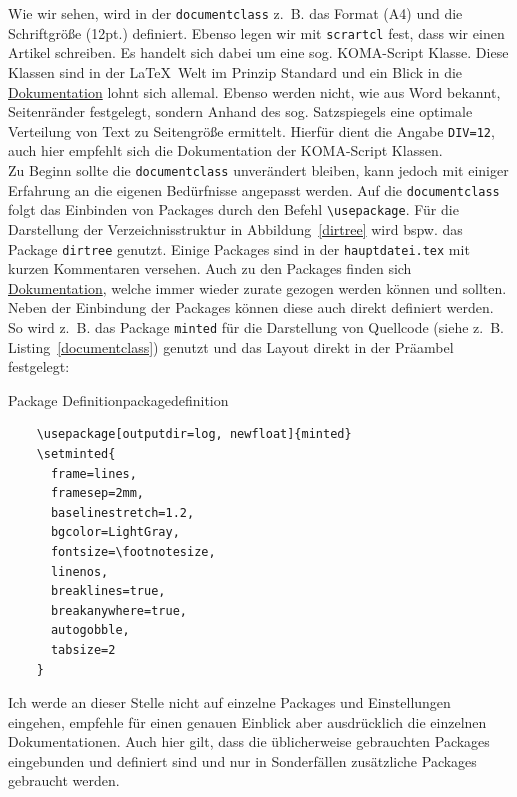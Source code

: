Wie wir sehen, wird in der \texttt{documentclass} z. B. das Format (A4) und die
Schriftgröße (12pt.) definiert. Ebenso legen wir mit \texttt{scrartcl} fest,
dass wir einen Artikel schreiben. Es handelt sich dabei um eine sog. KOMA-Script
Klasse. Diese Klassen sind in der \LaTeX~Welt im Prinzip Standard und ein Blick
in die
\href{https://ftp.agdsn.de/pub/mirrors/latex/dante/macros/latex/contrib/koma-script/doc/scrguide-de.pdf}{Dokumentation}
lohnt sich allemal. Ebenso werden nicht, wie aus Word bekannt, Seitenränder
festgelegt, sondern Anhand des sog. Satzspiegels eine optimale Verteilung von
Text zu Seitengröße ermittelt. Hierfür dient die Angabe \texttt{DIV=12}, auch
hier empfehlt sich die Dokumentation der KOMA-Script Klassen.\\ Zu Beginn sollte
die \texttt{documentclass} unverändert bleiben, kann jedoch mit einiger Erfahrung an die 
eigenen Bedürfnisse angepasst werden. Auf die
\texttt{documentclass} folgt das Einbinden von Packages durch den Befehl
\texttt{\textbackslash usepackage}. Für die Darstellung der Verzeichnisstruktur
in Abbildung~\ref{dirtree} wird bspw. das Package \texttt{dirtree} genutzt.
Einige Packages sind in der \texttt{hauptdatei.tex} mit kurzen Kommentaren
versehen. Auch zu den Packages finden sich
\href{https://www.ctan.org}{Dokumentation}, welche immer wieder zurate
gezogen werden können und sollten. Neben der Einbindung der Packages können 
diese auch direkt definiert werden. So wird z. B. das Package \texttt{minted} 
für die Darstellung von Quellcode (siehe z. B. Listing~\ref{documentclass}) 
genutzt und das Layout direkt in der Präambel festgelegt:

\begin{code}{Package Definition}{packagedefinition}
	\begin{verbatim}
	\usepackage[outputdir=log, newfloat]{minted}
	\setminted{
	  frame=lines,
	  framesep=2mm,
	  baselinestretch=1.2,
	  bgcolor=LightGray,
	  fontsize=\footnotesize,
	  linenos,
	  breaklines=true,
	  breakanywhere=true,
	  autogobble,
	  tabsize=2
	}
	\end{verbatim}
\end{code}

Ich werde an dieser Stelle nicht auf einzelne Packages und Einstellungen
eingehen, empfehle für einen genauen Einblick aber ausdrücklich die einzelnen
Dokumentationen. Auch hier gilt, dass die üblicherweise gebrauchten Packages 
eingebunden und definiert sind und nur in Sonderfällen zusätzliche Packages
gebraucht werden.

